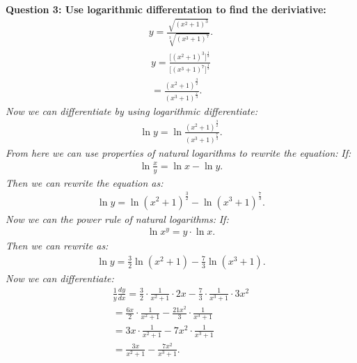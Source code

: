 \documentclass{report}
\begin{document}
    \pagebreak \bigbreak \noindent
    \begin{mdframed}
        \textbf{Question 3: Use logarithmic differentation to find the deriviative:}
        \begin{align*}
            y = \frac{\sqrt{(x^{2}+1)^{3}}}{\sqrt[3]{(x^{3}+1)^{7}}}
        .\end{align*}
        \bigbreak \noindent 
        \begin{align*}
            y = \frac{\big[(x^{2}+1)^{3}\big]^{\frac{1}{2}}}{\big[(x^{3}+1)^{7}\big]^{\frac{1}{3}}} \\
            = \frac{(x^{2}+1)^{\frac{3}{2}}}{(x^{3}+1)^{\frac{7}{3}}}
        .\end{align*}
        \bigbreak \noindent 
        \textit{Now we can differentiate by using logarithmic differentiate:}
        \begin{align*}
            \ln{y} = \ln{\frac{(x^{2}+1)^{\frac{3}{2}}}{(x^{3}+1)^{\frac{7}{3}}}}
        .\end{align*}
        \bigbreak \noindent 
        \textit{From here we can use properties of natural logarithms to rewrite the equation:}
        \bigbreak \noindent 
        \textit{If:}
        \begin{align*}
            \ln{\frac{x}{y}} = \ln{x} - \ln{y}
        .\end{align*}
        \bigbreak \noindent 
        \textit{Then we can rewrite the equation as:}
        \begin{align*}
            \ln{y} = \ln{(x^{2}+1)^{\frac{3}{2}}} - \ln{(x^{3}+1)^{\frac{7}{3}}}
        .\end{align*}
        \bigbreak \noindent 
        \textit{Now we can the power rule of natural logarithms:}
        \bigbreak \noindent 
        \textit{If:}
        \begin{align*}
            \ln{x^{y}} = y \cdot \ln{x}
        .\end{align*}
        \bigbreak \noindent 
        \textit{Then we can rewrite as:}
        \begin{align*}
            \ln{y} = \frac{3}{2}\ln{(x^{2}+1)} - \frac{7}{3}\ln{(x^{3}+1)}
        .\end{align*}
        \textit{Now we can differentiate:}
        \begin{align*}
            \frac{1}{y}\frac{dy}{dx} = \frac{3}{2} \cdot \frac{1}{x^{2}+1} \cdot 2x - \frac{7}{3}\cdot \frac{1}{x^{3}+1} \cdot 3x^{2} \\
            = \frac{6x}{2}\cdot \frac{1}{x^{2}+1} - \frac{21x^{2}}{3}\cdot \frac{1}{x^{3}+1} \\
            = 3x \cdot \frac{1}{x^{2}+1} - 7x^{2}\cdot \frac{1}{x^{3}+1} \\
            = \frac{3x}{x^{2}+1} - \frac{7x^{2}}{x^{3}+1}
        .\end{align*}
    \end{mdframed}
\end{document}
